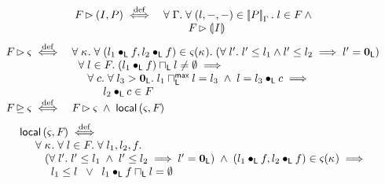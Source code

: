 %
\[
\begin{array}{r l}
 \fence{} \fences (I, P) \iffdef & 
 \for{\lenv} \for{(l, -, -) \in \sem[\lenv]{P}} l  \in \fence{} \;\land\\
 & \hspace*{0.8cm} \fence{} \fences \intermediateSemI{I}
\end{array}
\]
% 
\[ 
\begin{array}{r l}
  \fence{} \fences \amod{} \iffdef 
 & \for{\ca{}} \for {(l_1 \composeL f, l_2 \composeL f) \in \amod{}(\ca{})} (\for{l'} l' \leq l_1 \land l' \leq l_2 \implies l' = \unitL ) \\
 & \hspace*{0.2cm} \for{l \in \fence{}} (l_1 \composeL f) \meetL l \not= \emptyset \implies \\
 & \hspace*{0.5cm} \for{c} \for{l_3 > \unitL} l_1 \maxMeetL l = l_3 \;\land\; l = l_3 \composeL c\implies\\
 & \hspace*{1cm} l_2 \composeL c \in \fence{}\\



	 \fence{} \strictfences \amod{} \iffdef
 		& \fence{} \fences \amod{} \;\land\; \local{\amod{}}{\fence{}}
\end{array}
\]
%
%
\[
\begin{array}{l}
	\local{\amod{}}{\fence{}} \iffdef\\
	\hspace*{0.5cm}
	\for{\ca{}} \for{l \in \fence{}} \for{l_1, l_2, f}\\
	\hspace*{0.8cm} (\for{l'} l' \leq l_1 \;\land\; l' \leq l_2 \implies l' = \unitL) \;\land\; (l_1 \composeL f, l_2 \composeL f) \in \amod{}(\ca{})  \implies \\
	 \hspace*{1cm} l_1 \leq l \;\;\lor\;\; l_1 \composeL f \meetL l = \emptyset\\
\end{array}
\]
%
